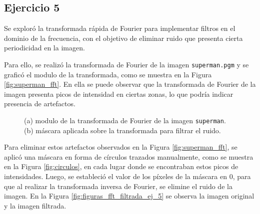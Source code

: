 \documentclass[11pt, twocolumn]{article}
\begin{document}
\subsection*{Ejercicio 5}
Se exploró la transformada rápida de Fourier para implementar filtros en el dominio de la frecuencia, con el objetivo de eliminar ruido que presenta cierta periodicidad en la imagen. 

Para ello, se realizó la transformada de Fourier de la imagen \texttt{superman.pgm} y se graficó el modulo de la transformada, como se muestra en la Figura \ref{fig:superman_fft}. En ella se puede observar que la transformada de Fourier de la imagen presenta picos de intensidad en ciertas zonas, lo que podría indicar presencia de artefactos.

\begin{figure}[htbp]
  \centering
  \hfill
  \hfill
  \caption{(a) modulo de la transformada de Fourier de la imagen \texttt{superman}. (b) máscara aplicada sobre la transformada para filtrar el ruido.}
  \label{fig:figuras_fft_ej_5}
\end{figure}

Para eliminar estos artefactos observados en la Figura \ref{fig:superman_fft}, se aplicó una máscara en forma de círculos trazados manualmente, como se muestra en la Figura \ref{fig:circulos}, en cada lugar donde se encontraban estos picos de intensidades. Luego, se estableció el valor de los píxeles de la máscara en $0$, para que al realizar la transformada inversa de Fourier, se elimine el ruido de la imagen. En la Figura \ref{fig:figuras_fft_filtrada_ej_5} se observa la imagen original y la imagen filtrada.
\end{document}
